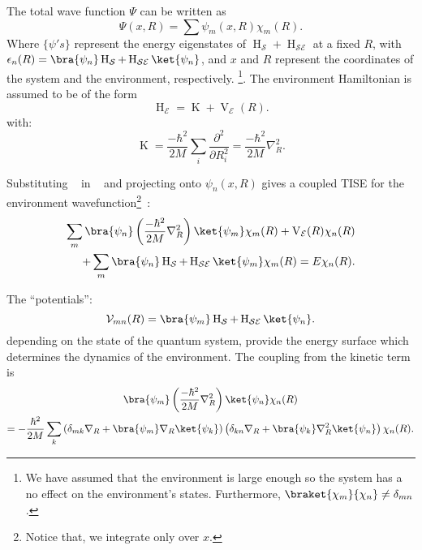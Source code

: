 The total wave function $\Psi$ can be written as
\begin{equation}
    \label{eqn:chap2_total_wavefunction}
    \Psi(x, R) = \sum  \psi_m (x, R) \chi_m(R).
\end{equation}
Where \(\{\psi 's\}\) represent the energy eigenstates of \(\operatorname{H}_{\mathcal{S}} + \operatorname{H}_{\mathcal{SE}}\) at a fixed $R$, with \\ \(\epsilon_n (R) =  \bra{\psi_n}\operatorname{H}_{\mathcal{S}} + \operatorname{H}_{\mathcal{SE}}\ket{\psi_n}\), and $x$ and $R$ represent the coordinates of the system and the environment, respectively.
\footnote{We have assumed that the environment is large enough so the system  has a 
no effect on the environment's states. Furthermore, \(\braket{\chi_m}{\chi_n} \not = \delta_{mn}\).}. 
The environment Hamiltonian is assumed to be of the form
\begin{equation}
    \label{eqn:chap2_env_hamiltonian}
    \operatorname{H}_{\mathcal{E}} = \operatorname{K} + \operatorname{V}_{\mathcal{E}} (R).
\end{equation}
with:
\begin{equation}
    \operatorname{K} = \frac{-\hbar^2}{2M} \sum_i \frac{\partial^2}{\partial R_i^2} = \frac{-\hbar^2}{2M} 
    \nabla _R^2.
\end{equation}

Substituting ~ in ~ and projecting onto
$\psi_n(x, R)$ gives a coupled TISE for the environment wavefunction\footnote{Notice 
that, we integrate only over $x$.}~\cite{briggs2001derivation}:
\begin{equation}
    \label{eqn:briggs_rost_eq5}
    \begin{aligned}
        \sum_{m} \bra{\psi_n} \left(\frac{-\hbar^2}{2M} \nabla_R^2 \right) \ket{\psi_m} \chi_m(R) 
    + \operatorname{V}_{\mathcal{E}}(R) \chi_n(R)\\
    + \sum_{m} \bra{\psi_n} \operatorname{H}_{\mathcal{S}} + \operatorname{H}_{\mathcal{SE}}\ket{\psi_m}\chi_m(R) = E \chi_n(R).
    \end{aligned}
\end{equation}

The ``potentials'':
\begin{equation}
    \mathcal{V}_{mn}(R) = \bra{\psi_m} \operatorname{H}_{\mathcal{S}} + \operatorname{H}_{\mathcal{SE}}
    \ket{\psi_n}.
\end{equation}
depending on the state of the quantum system, provide the energy surface
which determines the dynamics of the environment. The coupling from the kinetic term is
\begin{equation}
    \begin{gathered}
        \bra{\psi_m} \left(\frac{-\hbar^2}{2M} 
        \nabla_R^2 \right) \ket{\psi_n} \chi_n(R) \\
        = -\frac{\hbar^2}{2M} \sum_k \left(\delta_{mk} \nabla_R+ \bra{\psi_m}\nabla_R
    \ket{\psi_k}\right)\left(\delta_{kn} \nabla_R+ \bra{\psi_k}\nabla_R^2\ket{\psi_n}\right)
     \chi_n(R).
    \end{gathered}
\end{equation}

